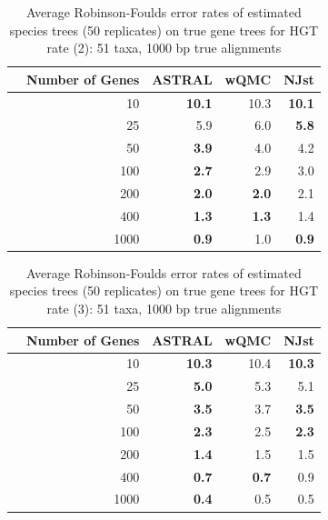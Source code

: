 \begin{table}[h!]
\caption[Error rates of estimated species trees (50 replicates)  on true gene trees for HGT rate 2]{Average Robinson-Foulds error rates of estimated species trees (50 replicates)  on true gene trees for HGT rate (2): 51 taxa, 1000 bp true alignments}
\begin{tabular}{rrrrr}
 & Number of Genes & ASTRAL & wQMC   & NJst\\
\hline
 & 10 & \textbf{10.1} & 10.3 &   \textbf{10.1}\\
 & 25 & 5.9 & 6.0 &   \textbf{5.8} \\
 & 50 & \textbf{3.9} & 4.0 &   4.2\\
 & 100 & \textbf{2.7} & 2.9   & 3.0\\
 & 200 & \textbf{2.0} & \textbf{2.0}   & 2.1\\
 & 400 & \textbf{1.3} & \textbf{1.3}   & 1.4\\
 & 1000 & \textbf{0.9} & 1.0   & \textbf{0.9}\\
\end{tabular}
\label{hgt::table8}
\end{table}

\begin{table}[h!]
\caption[Error rates of estimated species trees (50 replicates)  on true gene trees for HGT rate 3]{Average Robinson-Foulds error rates of estimated species trees (50 replicates) on true gene trees for HGT rate (3): 51 taxa, 1000 bp true alignments}
\begin{tabular}{rrrrr}
 & Number of Genes & ASTRAL & wQMC  & NJst\\
\hline
 & 10 & \textbf{10.3} & 10.4 &   \textbf{10.3}\\
 & 25 & \textbf{5.0} & 5.3 &   5.1\\
 & 50 & \textbf{3.5} & 3.7 &   \textbf{3.5}\\
 & 100 & \textbf{2.3} & 2.5   & \textbf{2.3} \\
 & 200 & \textbf{1.4} & 1.5   & 1.5\\
 & 400 & \textbf{0.7} & \textbf{0.7}   & 0.9\\
 & 1000 & \textbf{0.4} & 0.5 & 0.5\\
\end{tabular}
\label{hgt::table9}
\end{table}


